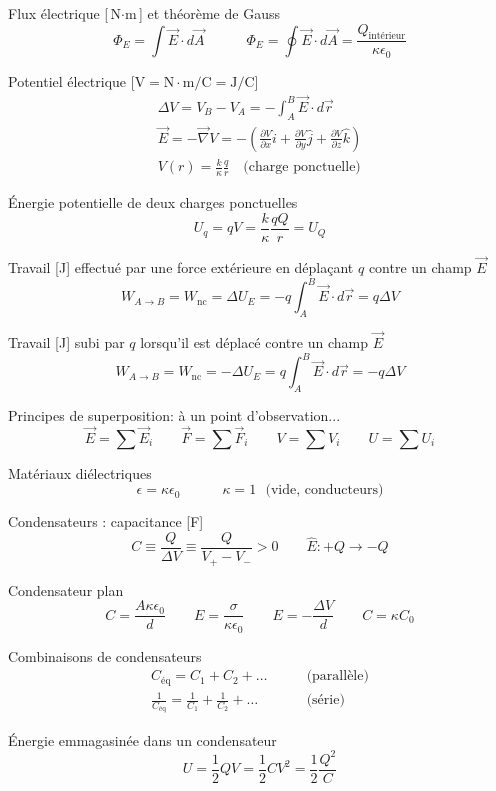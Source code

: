 \documentclass[10pt,landscape]{article}
\newcommand{\uvec}[1]{\ensuremath{{\hat{#1}}}}
\begin{document}
\begin{multicols}{3}
Flux électrique [$\si{\newton\cdot\metre}$] et théorème de Gauss
\[ 
\Phi_E = \int \vec{E}\cdot d\vec{A}
\qquad\quad
\Phi_E = \oint \vec{E}\cdot d\vec{A} = \frac{Q_\text{intérieur}}{\kappa \epsilon_0} \]

Potentiel électrique [$\si{\volt} = \si{\newton\cdot\metre/\coulomb} = \si{\joule/\coulomb}$]
\begin{gather*}
\Delta V = V_B - V_A  = -\int_A^B \vec{E}\cdot d\vec{r} \\
 \vec{E} = -\vec\nabla V = - \left( \frac{\partial V}{\partial x}\uvec{i} + \frac{\partial V}{\partial y}\uvec{j} + \frac{\partial V}{\partial z}\uvec{k} \right) \\
V(r) = \frac{k}{\kappa}  \frac{q}{r } \quad \text{(charge ponctuelle)}
\end{gather*}

Énergie potentielle de deux charges ponctuelles
\[ U_q = qV = \frac{k}{\kappa}  \frac{qQ}{r} = U_Q\]

Travail [\si{\joule}] effectué par une force extérieure en déplaçant $q$ contre un champ $\vec{E}$
\[ W_{A\to B} = W_\text{nc} = \Delta U_E = -q\int_{A}^{B} \vec{E}\cdot d\vec{r} = q\Delta V \]

Travail [\si{\joule}] subi par $q$ lorsqu'il est déplacé contre un champ $\vec{E}$
\[ W_{A\to B} = W_\text{nc} = -\Delta U_E = q\int_{A}^{B} \vec{E}\cdot d\vec{r} =- q\Delta V \]

Principes de superposition: à un point d'observation...
\[ \vec{E} = \sum \vec{E}_i 
\qquad
 \vec{F} = \sum \vec{F}_i 
\qquad
V = \sum {V}_i 
\qquad
U = \sum {U}_i 
\]

Matériaux diélectriques
\[ \epsilon = \kappa \epsilon_0 
\qquad\quad
\kappa = 1 \text{ {(vide, conducteurs)}}\]

Condensateurs : capacitance [\si{\farad}] 
\[ C \equiv \frac{Q}{\Delta V} \equiv \frac{Q}{V_+ - V_-} > 0 
\qquad \uvec{E}: +Q \to -Q \]

Condensateur plan \[ C = \frac{A\kappa\epsilon_0}{d} 
\qquad 
E = \frac{\sigma}{\kappa\epsilon_0}
\qquad
E =  -\frac{\Delta V}{d} 
\qquad
C = \kappa C_0 \]

Combinaisons de condensateurs \begin{align*}
C_\text{éq} = C_1 + C_2 + \dots  \qquad &\text{(parallèle)} \\
\frac{1}{C_\text{éq}} = \frac{1}{C_1} + \frac{1}{C_2} + \dots \qquad &\text{(série)}
\end{align*}


Énergie emmagasinée dans un condensateur
\[ U = \frac{1}{2} QV = \frac{1}{2} CV^2 = \frac{1}{2}\frac{Q^2}{C} \]



\end{multicols}
\end{document}
